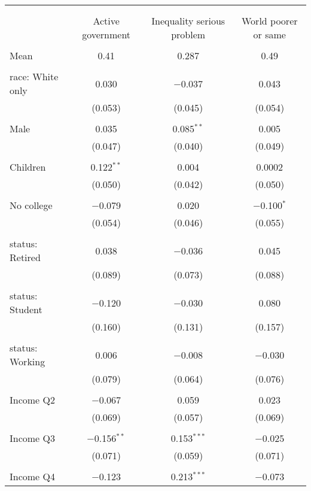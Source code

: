 
\begin{tabular}{@{\extracolsep{5pt}}lccc} 
\\[-1.8ex]\hline 
\hline \\[-1.8ex] 
\\[-1.8ex] & Active government & Inequality serious problem & World poorer or same \\ 
\hline \\[-1.8ex] 
 Mean & 0.41 & 0.287 & 0.49  \\ \hline \\[-1.8ex] race: White only & 0.030 & $-$0.037 & 0.043 \\ 
  & (0.053) & (0.045) & (0.054) \\ 
  & & & \\ 
 Male & 0.035 & 0.085$^{**}$ & 0.005 \\ 
  & (0.047) & (0.040) & (0.049) \\ 
  & & & \\ 
 Children & 0.122$^{**}$ & 0.004 & 0.0002 \\ 
  & (0.050) & (0.042) & (0.050) \\ 
  & & & \\ 
 No college & $-$0.079 & 0.020 & $-$0.100$^{*}$ \\ 
  & (0.054) & (0.046) & (0.055) \\ 
  & & & \\ 
 status: Retired & 0.038 & $-$0.036 & 0.045 \\ 
  & (0.089) & (0.073) & (0.088) \\ 
  & & & \\ 
 status: Student & $-$0.120 & $-$0.030 & 0.080 \\ 
  & (0.160) & (0.131) & (0.157) \\ 
  & & & \\ 
 status: Working & 0.006 & $-$0.008 & $-$0.030 \\ 
  & (0.079) & (0.064) & (0.076) \\ 
  & & & \\ 
 Income Q2 & $-$0.067 & 0.059 & 0.023 \\ 
  & (0.069) & (0.057) & (0.069) \\ 
  & & & \\ 
 Income Q3 & $-$0.156$^{**}$ & 0.153$^{***}$ & $-$0.025 \\ 
  & (0.071) & (0.059) & (0.071) \\ 
  & & & \\ 
 Income Q4 & $-$0.123 & 0.213$^{***}$ & $-$0.073 \\ 

\end{tabular}
